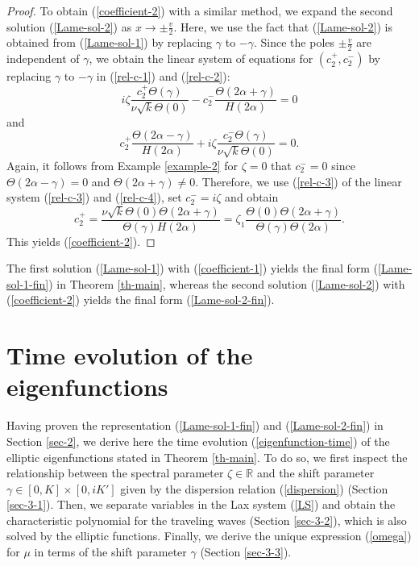 \documentclass[12pt,reqno]{amsart}
\numberwithin{equation}{section}
\begin{document}
\begin{proof}
To obtain (\ref{coefficient-2}) with a similar method, we expand the second solution (\ref{Lame-sol-2}) as $x \to \pm \frac{v}{2}$.  Here, we use the fact that (\ref{Lame-sol-2}) 
is obtained from (\ref{Lame-sol-1}) by replacing $\gamma$ to $-\gamma$. Since the poles $\pm \frac{v}{2}$ are independent of $\gamma$, we obtain the linear system of equations for $(c_2^+,c_2^-)$ by replacing $\gamma$ to $-\gamma$ in (\ref{rel-c-1}) and (\ref{rel-c-2}):
\begin{equation}
\label{rel-c-3}
i \zeta  \frac{c_2^+ \Theta(\gamma)}{\nu \sqrt{k} \Theta(0)} 
- c_2^- \frac{\Theta(2 \alpha + \gamma)}{H(2\alpha)} = 0
\end{equation}
and
\begin{equation}
\label{rel-c-4}
c_2^+ \frac{\Theta(2 \alpha - \gamma)}{H(2\alpha)} + i \zeta \frac{c_2^-  \Theta(\gamma)}{\nu \sqrt{k} \Theta(0)} = 0.
\end{equation}
Again, it follows from Example \ref{example-2} for $\zeta = 0$ that $c_2^- = 0$ since $\Theta(2\alpha - \gamma) = 0$ and $\Theta(2\alpha + \gamma) \neq 0$. 
Therefore, we use (\ref{rel-c-3}) of the linear system 
(\ref{rel-c-3}) and (\ref{rel-c-4}), set $c_2^- = i\zeta$ and obtain 
$$
c_2^+ = \frac{\nu \sqrt{k} \Theta(0) \Theta(2\alpha + \gamma)}{\Theta(\gamma) H(2\alpha)} = \zeta_1 \frac{\Theta(0) \Theta(2\alpha + \gamma)}{\Theta(\gamma) \Theta(2\alpha)}.
$$
This yields (\ref{coefficient-2}).
\end{proof}

The first solution (\ref{Lame-sol-1}) with (\ref{coefficient-1}) yields 
the final form (\ref{Lame-sol-1-fin}) in Theorem \ref{th-main}, whereas  
the second solution  (\ref{Lame-sol-2}) with (\ref{coefficient-2}) yields 
the final form (\ref{Lame-sol-2-fin}). 



\section{Time evolution of the eigenfunctions}
\label{sec-3}

Having proven the representation (\ref{Lame-sol-1-fin}) and (\ref{Lame-sol-2-fin}) in Section \ref{sec-2}, we derive here the time evolution (\ref{eigenfunction-time}) of the elliptic eigenfunctions stated in Theorem \ref{th-main}. To do so, we first inspect the relationship between the spectral parameter $\zeta \in \mathbb{R}$ and the shift parameter $\gamma \in [0,K] \times [0,iK']$ given by the dispersion relation (\ref{dispersion}) (Section \ref{sec-3-1}). Then, we separate variables in the Lax system (\ref{LS}) and obtain the characteristic polynomial 
for the traveling waves (Section \ref{sec-3-2}), which is also solved by the elliptic functions. Finally, we derive the unique expression (\ref{omega}) for $\mu$ in terms of the shift parameter $\gamma$ (Section \ref{sec-3-3}). 
\end{document}
